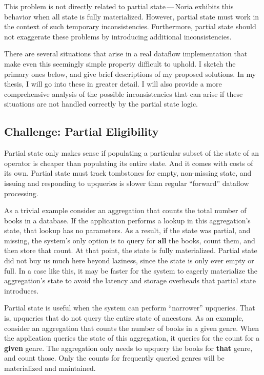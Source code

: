 This problem is not directly related to partial state\,---\,Noria exhibits this
behavior when all state is fully materialized. However, partial state must work
in the context of such temporary inconsistencies. Furthermore, partial state
should not exaggerate these problems by introducing additional inconsistencies.

There are several situations that arise in a real dataflow implementation that
make even this seemingly simple property difficult to uphold. I sketch the
primary ones below, and give brief descriptions of my proposed solutions. In my
thesis, I will go into these in greater detail. I will also provide a more
comprehensive analysis of the possible inconsistencies that can arise if these
situations are not handled correctly by the partial state logic.

\subsection{Challenge: Partial Eligibility}

Partial state only makes sense if populating a particular subset of the
state of an operator is cheaper than populating its entire state. And it
comes with costs of its own. Partial state must track tombstones for
empty, non-missing state, and issuing and responding to upqueries is
slower than regular ``forward'' dataflow processing.

As a trivial example consider an aggregation that counts the total
number of books in a database. If the application performs a lookup in
this aggregation's state, that lookup has no parameters. As a result, if
the state was partial, and missing, the system's only option is to query
for \textbf{all} the books, count them, and then store that count. At that
point, the state is fully materialized. Partial state did not buy us
much here beyond laziness, since the state is only ever empty or full.
In a case like this, it may be faster for the system to eagerly
materialize the aggregation's state to avoid the latency and storage
overheads that partial state introduces.

Partial state is useful when the system can perform ``narrower'' upqueries.
That is, upqueries that do not query the entire state of ancestors. As
an example, consider an aggregation that counts the number of books in a
given genre. When the application queries the state of this aggregation,
it queries for the count for a \textbf{given} genre. The aggregation only
needs to upquery the books for \textbf{that} genre, and count those. Only the
counts for frequently queried genres will be materialized and
maintained.

